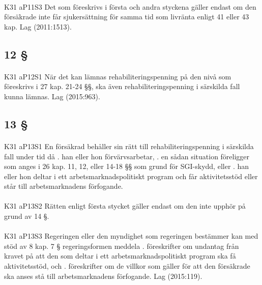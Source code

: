 \documentclass[a4paper,notitlepage,openany,10pt]{book}
\begin{document}
\paragraph*{}
{\tiny K31 aP11S3}
Det som föreskrivs i första och andra styckena gäller endast om den försäkrade inte får sjukersättning för samma tid som livränta enligt 41 eller 43 kap.
Lag (2011:1513).
\subsection*{12 §}
\paragraph*{}
{\tiny K31 aP12S1}
När det kan lämnas rehabiliteringspenning på den nivå som föreskrivs i 27 kap. 21-24 §§, ska även rehabiliteringspenning i särskilda fall kunna lämnas.
Lag (2015:963).
\subsection*{13 §}
\paragraph*{}
{\tiny K31 aP13S1}
En försäkrad behåller sin rätt till rehabiliteringspenning i särskilda fall under tid då
. han eller hon förvärvsarbetar,
. en sådan situation föreligger som anges i 26 kap. 11, 12, eller 14-18 §§ som grund för SGI-skydd, eller
. han eller hon deltar i ett arbetsmarknadspolitiskt program och får aktivitetsstöd eller står till arbetsmarknadens förfogande.
\paragraph*{}
{\tiny K31 aP13S2}
Rätten enligt första stycket gäller endast om den inte upphör på grund av 14 §.
\paragraph*{}
{\tiny K31 aP13S3}
Regeringen eller den myndighet som regeringen bestämmer kan med stöd av 8 kap. 7 § regeringsformen meddela
. föreskrifter om undantag från kravet på att den som deltar i ett arbetsmarknadspolitiskt program ska få aktivitetsstöd, och
. föreskrifter om de villkor som gäller för att den försäkrade ska anses stå till arbetsmarknadens förfogande.
Lag (2015:119).
\end{document}
